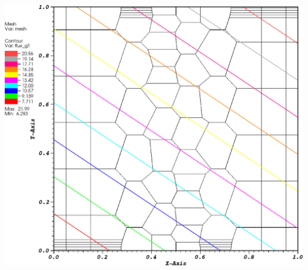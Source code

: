 \documentclass[compress,10pt]{beamer}
\begin{document}
\begin{frame}[t]
{\begin{columns}
{}\includegraphics[width=0.95\columnwidth]{images/z_poly_MAXENT_k1.eps} 
\end{columns}
}
\end{frame}
\end{document}
